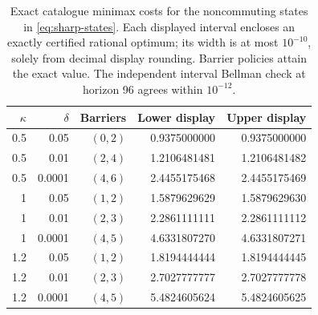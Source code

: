 \begin{table}[htbp]
\centering\small
\begin{tabular}{rrrrr}
\toprule
$\kappa$ & $\delta$ & Barriers & Lower display & Upper display\\
\midrule
0.5 & 0.05 & $(0,2)$ & 0.9375000000 & 0.9375000000\\
0.5 & 0.01 & $(2,4)$ & 1.2106481481 & 1.2106481482\\
0.5 & 0.0001 & $(4,6)$ & 2.4455175468 & 2.4455175469\\
1 & 0.05 & $(1,2)$ & 1.5879629629 & 1.5879629630\\
1 & 0.01 & $(2,3)$ & 2.2861111111 & 2.2861111112\\
1 & 0.0001 & $(4,5)$ & 4.6331807270 & 4.6331807271\\
1.2 & 0.05 & $(1,2)$ & 1.8194444444 & 1.8194444445\\
1.2 & 0.01 & $(2,3)$ & 2.7027777777 & 2.7027777778\\
1.2 & 0.0001 & $(4,5)$ & 5.4824605624 & 5.4824605625\\
\bottomrule\end{tabular}
\caption{Exact catalogue minimax costs for the noncommuting states in
\eqref{eq:sharp-states}. Each displayed interval encloses an exactly certified rational optimum;
its width is at most $10^{-10}$, solely from decimal display rounding. Barrier policies attain
the exact value. The independent interval Bellman check at horizon 96 agrees within $10^{-12}$.}
\label{tab:sharp-costs}
\end{table}
